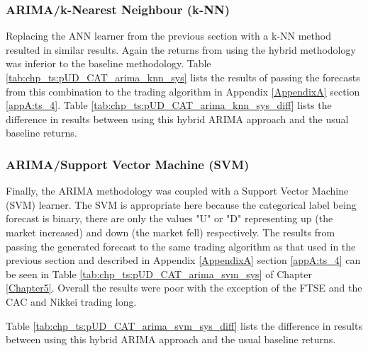 \subsubsection{ARIMA/k-Nearest Neighbour (k-NN)}
Replacing the ANN learner from the previous section with a k-NN method resulted in similar results. Again the returns from using the hybrid methodology was inferior to the baseline methodology. Table \ref{tab:chp_ts:pUD_CAT_arima_knn_sys} lists the results of passing the forecasts from this combination to the trading algorithm in Appendix \ref{AppendixA} section \ref{appA:ts_4}. Table \ref{tab:chp_ts:pUD_CAT_arima_knn_sys_diff} lists the difference in results between using this hybrid ARIMA approach and the usual baseline returns. 



\subsubsection{ARIMA/Support Vector Machine (SVM)}
Finally, the ARIMA methodology was coupled with a Support Vector Machine (SVM) learner. The SVM is appropriate here because the categorical label being forecast is binary, there are only the values "U" or "D" representing up (the market increased) and down (the market fell) respectively. The results from passing the generated forecast to the same trading algorithm as that used in the previous section and described in Appendix \ref{AppendixA} section \ref{appA:ts_4} can be seen in Table \ref{tab:chp_ts:pUD_CAT_arima_svm_sys} of Chapter \ref{Chapter5}. Overall the results were poor with the exception of the FTSE and the CAC and Nikkei trading long.

Table \ref{tab:chp_ts:pUD_CAT_arima_svm_sys_diff} lists the difference in results between using this hybrid ARIMA approach and the usual baseline returns. 



